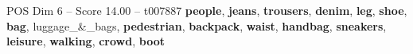 \begin{textsample}{POS Dim 6 – Score 14.00 – t007887}  \label{ex:f6_pos_036}
\textbf{people}, \textbf{jeans}, \textbf{trousers}, \textbf{denim}, \textbf{leg}, \textbf{shoe}, \textbf{bag}, luggage\_\&\_bags, \textbf{pedestrian}, \textbf{backpack}, \textbf{waist}, \textbf{handbag}, \textbf{sneakers}, \textbf{leisure}, \textbf{walking}, \textbf{crowd}, \textbf{boot}

\end{textsample}
